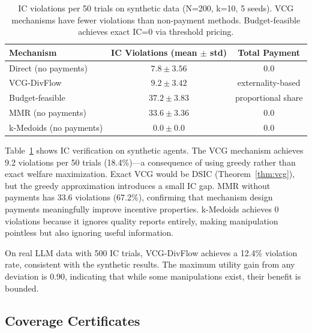 \documentclass[10pt]{article}
\begin{document}
\begin{table}[t]
\centering
\caption{IC violations per 50 trials on synthetic data (N=200, k=10, 5 seeds). VCG mechanisms have fewer violations than non-payment methods. Budget-feasible achieves exact IC=0 via threshold pricing.}
\label{tab:ic}
\begin{tabular}{lcc}
\toprule
\textbf{Mechanism} & \textbf{IC Violations (mean $\pm$ std)} & \textbf{Total Payment} \\
\midrule
Direct (no payments)       & $7.8 \pm 3.56$ & 0.0 \\
VCG-DivFlow               & $9.2 \pm 3.42$ & externality-based \\
Budget-feasible            & $37.2 \pm 3.83$ & proportional share \\
MMR (no payments)          & $33.6 \pm 3.36$ & 0.0 \\
k-Medoids (no payments)    & $0.0 \pm 0.0$ & 0.0 \\
\bottomrule
\end{tabular}
\end{table}

Table~\ref{tab:ic} shows IC verification on synthetic agents.
The VCG mechanism achieves 9.2 violations per 50 trials (18.4\%)---a consequence of using greedy rather than exact welfare maximization.
Exact VCG would be DSIC (Theorem~\ref{thm:vcg}), but the greedy approximation introduces a small IC gap.
MMR without payments has 33.6 violations (67.2\%), confirming that mechanism design payments meaningfully improve incentive properties.
k-Medoids achieves 0 violations because it ignores quality reports entirely, making manipulation pointless but also ignoring useful information.

On real LLM data with 500 IC trials, VCG-DivFlow achieves a 12.4\% violation rate, consistent with the synthetic results.
The maximum utility gain from any deviation is 0.90, indicating that while some manipulations exist, their benefit is bounded.

\subsection{Coverage Certificates}
\label{sec:coverage-results}
\end{document}
